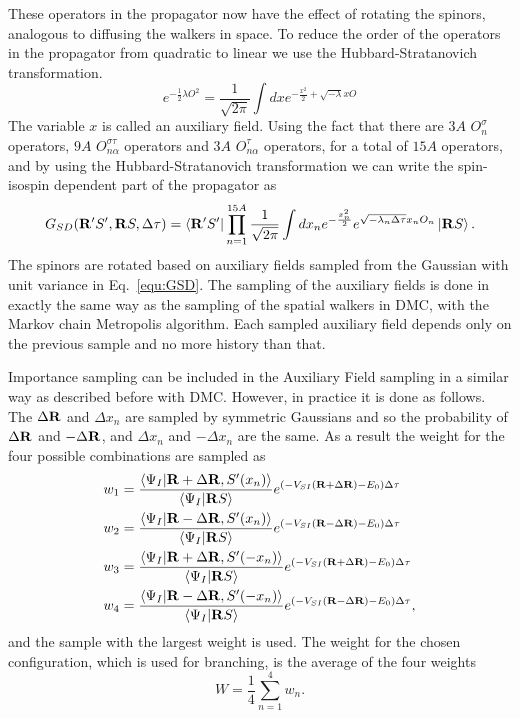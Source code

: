 These operators in the propagator now have the effect of rotating the spinors, analogous to diffusing the walkers in space. To reduce the order of the operators in the propagator from quadratic to linear we use the Hubbard-Stratanovich transformation.
\begin{equation}
   e^{-\frac{1}{2}\lambda O^2} = \frac{1}{\sqrt{2\pi}} \int dx e^{-\frac{x^2}{2} + \sqrt{-\lambda}x O}
\end{equation}
The variable $x$ is called an auxiliary field. Using the fact that there are $3A$ $O_{n}^{\sigma}$ operators, $9A$ $O_{n\alpha}^{\sigma\tau}$ operators and $3A$ $O_{n\alpha}^{\tau}$ operators, for a total of $15A$ operators, and by using the Hubbard-Stratanovich transformation we can write the spin-isospin dependent part of the propagator as
\begin{equation}
   G_{SD}(\mathbf{R}'S',\mathbf{R} S,\Delta\tau) = \left< \mathbf{R}'S' \right|\prod\limits_{n=1}^{15A}\frac{1}{\sqrt{2\pi}}\int dx_n e^{-\frac{x_n^2}{2}}e^{\sqrt{-\lambda_n\Delta\tau} x_nO_n}\left| \mathbf{R} S \right>.
   \label{equ:GSD}
\end{equation}
The spinors are rotated based on auxiliary fields sampled from the Gaussian with unit variance in Eq.~\ref{equ:GSD}. The sampling of the auxiliary fields is done in exactly the same way as the sampling of the spatial walkers in DMC, with the Markov chain Metropolis algorithm. Each sampled auxiliary field depends only on the previous sample and no more history than that.

Importance sampling can be included in the Auxiliary Field sampling in a similar way as described before with DMC. However, in practice it is done as follows. The $\Delta \mathbf{R}$ and $\Delta x_n$ are sampled by symmetric Gaussians and so the probability of $\Delta \mathbf{R}$ and $-\Delta \mathbf{R}$, and $\Delta x_n$ and $-\Delta x_n$ are the same. As a result the weight for the four possible combinations are sampled as
\begin{align}
   w_1 &= \frac{\left< \Psi_I | \mathbf{R}+\Delta \mathbf{R}, S'(x_n) \right>}{\left< \Psi_I | \mathbf{R} S \right>} e^{\left(-V_{SI}(\mathbf{R}+\Delta\mathbf{R}) - E_0\right)\Delta\tau} \\
   w_2 &= \frac{\left< \Psi_I | \mathbf{R}-\Delta \mathbf{R}, S'(x_n) \right>}{\left< \Psi_I | \mathbf{R} S \right>} e^{\left(-V_{SI}(\mathbf{R}-\Delta\mathbf{R}) - E_0\right)\Delta\tau} \\
   w_3 &= \frac{\left< \Psi_I | \mathbf{R}+\Delta \mathbf{R}, S'(-x_n) \right>}{\left< \Psi_I | \mathbf{R} S \right>} e^{\left(-V_{SI}(\mathbf{R}+\Delta\mathbf{R}) - E_0\right)\Delta\tau} \\
   w_4 &= \frac{\left< \Psi_I | \mathbf{R}-\Delta \mathbf{R}, S'(-x_n) \right>}{\left< \Psi_I | \mathbf{R} S \right>} e^{\left(-V_{SI}(\mathbf{R}-\Delta\mathbf{R}) - E_0\right)\Delta\tau},
\end{align}
and the sample with the largest weight is used. The weight for the chosen configuration, which is used for branching, is the average of the four weights
\begin{equation}
   W = \frac{1}{4}\sum\limits_{n=1}^4 w_n.
\end{equation}

